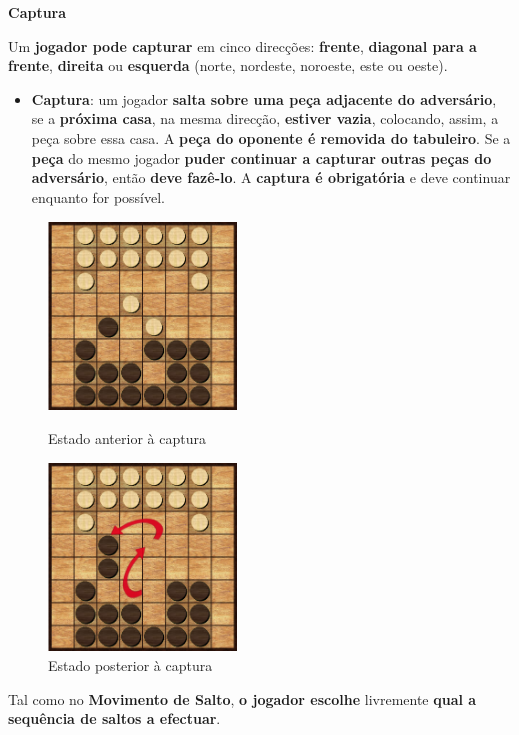 \documentclass[a4paper]{article}
\begin{document}
\large{\textbf{Captura}}
\begin{small}

Um \textbf{jogador pode capturar} em cinco direcções: \textbf{frente}, \textbf{diagonal para a frente}, \textbf{direita} ou \textbf{esquerda} (norte, nordeste, noroeste, este ou oeste). 

\begin{itemize}
\item \textbf{Captura}:
um jogador \textbf{salta sobre uma peça adjacente do adversário}, se a \textbf{próxima casa}, na mesma direcção, \textbf{estiver vazia}, colocando, assim, a peça sobre essa casa. A \textbf{peça do oponente é removida do tabuleiro}. Se a \textbf{peça} do mesmo jogador \textbf{puder continuar a capturar outras peças do adversário}, então \textbf{deve fazê-lo}. A \textbf{captura é obrigatória} e deve continuar enquanto for possível.
\end{itemize}

\begin{figure}[h!]
  \begin{minipage}[h!]{0.3\textwidth}
    \includegraphics[height=5cm,width=5cm]{res/captureMove.png}
    \caption{Estado anterior à captura}
    \label{fig:7}
  \end{minipage}
	\quad\quad\quad\quad\quad\quad\quad
  \begin{minipage}[h!]{0.3\textwidth}
    \includegraphics[height=5cm,width=5cm]{res/captureMoveResult.png}
    \caption{Estado posterior à captura}
    \label{fig:8}
  \end{minipage}
\end{figure}

Tal como no \textbf{Movimento de Salto}, \textbf{o jogador escolhe} livremente \textbf{qual a sequência de saltos a efectuar}.
\end{small}\newline
\end{document}
